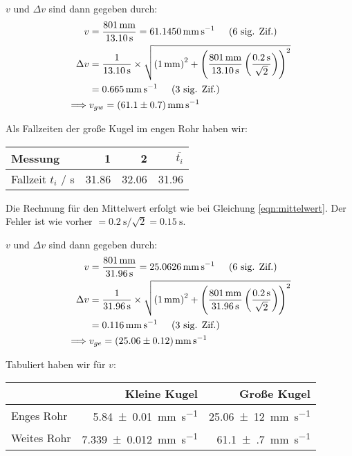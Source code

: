 		$v$ und $\Delta v$ sind dann gegeben durch:
		\begin{align}
			v &= \frac{\SI{801}{\milli\meter}}{\SI{13,10}{\second}} = \SI{61.1450}{\milli\meter\per\second} \sigfig{6} \\
			\Delta v &= \frac{1}{\SI{13,10}{\second}}\times\sqrt{\pbrace{\SI{1}{\milli\meter}}^2 + \pbrace{\frac{\SI{801}{\milli\meter}}{\SI{13,10}{\second}} \pbrace{\frac{\SI{0.2}{\second}}{\sqrt{2}}}}^2} \notag \\
			&= \SI{0.665}{\milli\meter\per\second} \sigfig{3} \\
			\implies &v_{gw}  = \SI{61.1(7)}{\milli\meter\per\second}
		\end{align}


		Als Fallzeiten der große Kugel im engen Rohr haben wir:
		\begin{center}
			\begin{tabular}{l rrr}
				\toprule
				Messung & \num{1} & \num{2} & $\overbar{t_i}$ \\ 
				\midrule
				Fallzeit $t_i$ / \si{\second} & \num{31,86} & \num{32,06} & \num{31,96} \\
				\bottomrule
			\end{tabular}
		\end{center}
		Die Rechnung für den Mittelwert erfolgt wie bei Gleichung \eqref{eqn:mittelwert}. Der Fehler ist wie vorher $= \SI{0.2}{\second} / \sqrt{2} = \SI{0.15}{\second}$.

		$v$ und $\Delta v$ sind dann gegeben durch:
		\begin{align}
			v &= \frac{\SI{801}{\milli\meter}}{\SI{31,96}{\second}} = \SI{25,0626}{\milli\meter\per\second} \sigfig{6} \\
			\Delta v &= \frac{1}{\SI{31,96}{\second}}\times\sqrt{\pbrace{\SI{1}{\milli\meter}}^2 + \pbrace{\frac{\SI{801}{\milli\meter}}{\SI{31,96}{\second}} \pbrace{\frac{\SI{0.2}{\second}}{\sqrt{2}}}}^2} \notag \\
			&= \SI{0.116}{\milli\meter\per\second} \sigfig{3} \\
			\implies &v_{ge}  = \SI{25,06(12)}{\milli\meter\per\second}
		\end{align}

		Tabuliert haben wir für $v$:
		\begin{center}
			\begin{tabular}{l | r r}
			& Kleine Kugel & Große Kugel \\
			\midrule
			Enges Rohr & \SI{5.84(1)}{\milli\meter\per\second} & \SI{25,06(12)}{\milli\meter\per\second} \\ 
			Weites Rohr & \SI{7.339(12)}{\milli\meter\per\second} & \SI{61.1(7)}{\milli\meter\per\second}
			\end{tabular}
		\end{center}

